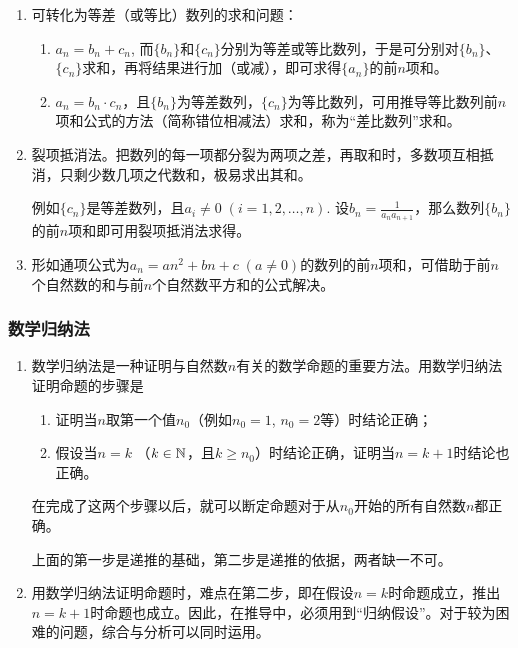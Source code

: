 \begin{enumerate}
\item 可转化为等差（或等比）数列的求和问题：
\begin{enumerate}[(1)]
    \item $a_n=b_n+c_n$, 而$\{b_n\}$和$\{c_n\}$分别为等差或等比数列，于是可分别对$\{b_n\}$、$\{c_n\}$求和，再将结果进行加（或减），即可求得$\{a_n\}$的前$n$项和。
    \item $a_n=b_n\cdot c_n$，且$\{b_n\}$为等差数列，$\{c_n\}$为等比数列，可用推导等比数列前$n$项和公式的方法（简称错位相减法）求和，称为“差比数列”求和。
\end{enumerate}

\item 裂项抵消法。把数列的每一项都分裂为两项之差，再取和时，多数项互相抵消，只剩少数几项之代数和，极易求出其和。

例如$\{c_n\}$是等差数列，且$a_i\ne 0\; (i=1,2,\ldots,n)$. 设$b_n=\frac{1}{a_na_{n+1}}$，那么数列$\{b_n\}$的前$n$项和即可用裂项抵消法求得。
\item 形如通项公式为$a_n=an^2+bn+c\; (a\ne 0)$的数列的前$n$项和，可借助于前$n$个自然数的和与前$n$个自然数平方和的公式解决。
\end{enumerate}

\subsubsection{数学归纳法}
\begin{enumerate}
    \item 数学归纳法是一种证明与自然数$n$有关的数学命题的重要方法。用数学归纳法证明命题的步骤是
\begin{enumerate}[(1)]
\item 证明当$n$取第一个值$n_0$（例如$n_0=1$, $n_0=2$等）时结论正确；
\item 假设当$n=k$ （$k\in\mathbb{N}$，且$k\ge n_0$）时结论正确，证明当$n=k+1$时结论也正确。
\end{enumerate}

在完成了这两个步骤以后，就可以断定命题对于从$n_0$开始的所有自然数$n$都正确。

上面的第一步是递推的基础，第二步是递推的依据，两者缺一不可。
\item 用数学归纳法证明命题时，难点在第二步，即在假设$n=k$时命题成立，推出$n=k+1$时命题也成立。因此，在推导中，必须用到“归纳假设”。对于较为困难的问题，综合与分析可以同时运用。
\end{enumerate}


